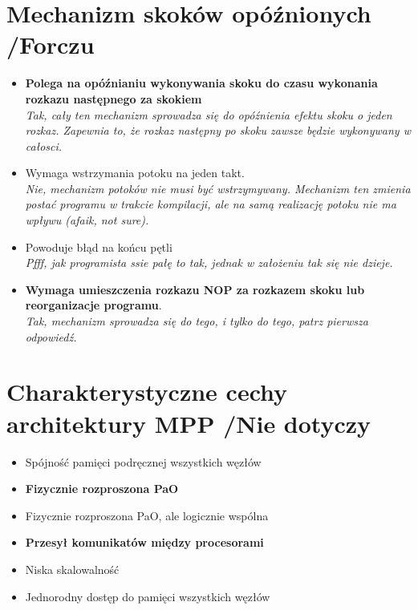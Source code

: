 \documentclass[a4paper,twoside]{article}
\begin{document}
\section{Mechanizm skoków opóźnionych {\small /Forczu}}
	\begin{itemize}
    \item \textbf{Polega na opóźnianiu wykonywania skoku do czasu wykonania rozkazu następnego za skokiem}\\
    {\small \emph{Tak, cały ten mechanizm sprowadza się do opóźnienia efektu skoku o jeden rozkaz. Zapewnia to, że rozkaz następny po skoku zawsze będzie wykonywany w całosci.}}
    \item Wymaga wstrzymania potoku na jeden takt.\\
    {\small \emph{Nie, mechanizm potoków nie musi być wstrzymywany. Mechanizm ten zmienia postać programu w trakcie kompilacji, ale na samą realizację potoku nie ma wpływu (afaik, not sure).}}
    \item Powoduje błąd na końcu pętli\\
    {\small \emph{Pfff, jak programista ssie pałę to tak, jednak w założeniu tak się nie dzieje.}}
    \item \textbf{Wymaga umieszczenia rozkazu NOP za rozkazem skoku lub reorganizacje programu}.\\
    {\small \emph{Tak, mechanizm sprowadza się do tego, i tylko do tego, patrz pierwsza odpowiedź.}}
    \end{itemize}
    
\section{Charakterystyczne cechy architektury MPP {\small /Nie dotyczy}}
	\begin{itemize}
    \item Spójność pamięci podręcznej wszystkich węzłów
    \item \textbf{Fizycznie rozproszona PaO}
    \item Fizycznie rozproszona PaO, ale logicznie wspólna
    \item \textbf{Przesył komunikatów między procesorami}
    \item Niska skalowalność
    \item Jednorodny dostęp do pamięci wszystkich węzłów
    \end{itemize}

\end{document}
